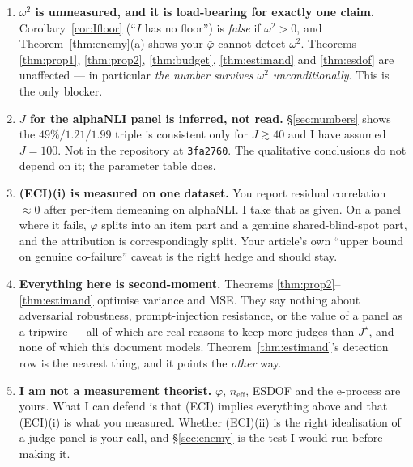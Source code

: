 \documentclass[11pt]{article}
\theoremstyle{plain}
\theoremstyle{definition}
\theoremstyle{remark}
\newcommand{\pb}{\bar{\varphi}}
\newcommand{\neff}{n_{\mathrm{eff}}}
\begin{document}
\begin{enumerate}
\item \textbf{$\omega^2$ is unmeasured, and it is load-bearing for exactly one claim.}
Corollary~\ref{cor:Ifloor} (``$I$ has no floor'') is \emph{false} if $\omega^2>0$, and
Theorem~\ref{thm:enemy}(a) shows your $\hat{\pb}$ cannot detect $\omega^2$. Theorems
\ref{thm:prop1}, \ref{thm:prop2}, \ref{thm:budget}, \ref{thm:estimand} and \ref{thm:esdof} are
unaffected --- in particular \emph{the number survives $\omega^2$ unconditionally}. This is the
only blocker.
\item \textbf{$J$ for the alphaNLI panel is inferred, not read.} \S\ref{sec:numbers} shows the
$49\%/1.21/1.99$ triple is consistent only for $J\gtrsim40$ and I have assumed $J=100$. Not in the
repository at \texttt{3fa2760}. The qualitative conclusions do not depend on it; the parameter
table does.
\item \textbf{(ECI)(i) is measured on one dataset.} You report residual correlation
$\approx0$ after per-item demeaning on alphaNLI. I take that as given. On a panel where it fails,
$\pb$ splits into an item part and a genuine shared-blind-spot part, and the attribution is
correspondingly split. Your article's own ``upper bound on genuine co-failure'' caveat is the right
hedge and should stay.
\item \textbf{Everything here is second-moment.} Theorems \ref{thm:prop2}--\ref{thm:estimand}
optimise variance and MSE. They say nothing about adversarial robustness, prompt-injection
resistance, or the value of a panel as a tripwire --- all of which are real reasons to keep more
judges than $J^\star$, and none of which this document models. Theorem~\ref{thm:estimand}'s
detection row is the nearest thing, and it points the \emph{other} way.
\item \textbf{I am not a measurement theorist.} $\pb$, $\neff$, ESDOF and the e-process are
yours. What I can defend is that (ECI) implies everything above and that (ECI)(i) is what you
measured. Whether (ECI)(ii) is the right idealisation of a judge panel is your call, and
\S\ref{sec:enemy} is the test I would run before making it.
\end{enumerate}
\end{document}
